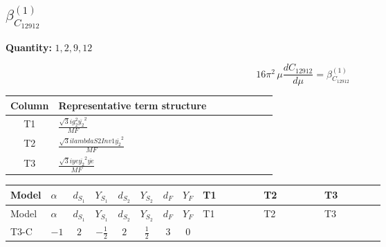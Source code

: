 \documentclass[8pt]{article}
\begin{document}
\begin{landscape}
\section*{$\beta_{C_{12912}}^{(1)}$}
\noindent\textbf{Quantity: }$\mathrm{1,2,9,12}$\par\smallskip
\[16\pi^2\,\mu\frac{d C_{12912}}{d\mu}=\beta_{C_{12912}}^{(1)}\]
\begin{center}
\begin{tabular}{@{}c >{\raggedright\arraybackslash}p{0.82\linewidth}@{}}
\toprule
Column & Representative term structure \\
\midrule
T1 & \(\displaystyle \frac{\sqrt{3} i g_{2}^{2} \overline{y_{2}}^{2}}{MF}\) \\
\midrule
T2 & \(\displaystyle \frac{\sqrt{3} i lambdaS2Inv1 \overline{y_{2}}^{2}}{MF}\) \\
\midrule
T3 & \(\displaystyle \frac{\sqrt{3} i ye \overline{y_{2}}^{2} \overline{ye}}{MF}\) \\
\midrule
\bottomrule
\end{tabular}
\end{center}
\smallskip
\tiny
\begin{longtable}{@{}llcccccc >{\raggedright\arraybackslash}p{0.21\linewidth} >{\raggedright\arraybackslash}p{0.21\linewidth} >{\raggedright\arraybackslash}p{0.21\linewidth}@{}}
\toprule
Model & $\alpha$ & $d_{S_1}$ & $Y_{S_1}$ & $d_{S_2}$ & $Y_{S_2}$ & $d_F$ & $Y_F$ & T1 & T2 & T3 \\
\midrule
\endfirsthead
\toprule
Model & $\alpha$ & $d_{S_1}$ & $Y_{S_1}$ & $d_{S_2}$ & $Y_{S_2}$ & $d_F$ & $Y_F$ & T1 & T2 & T3 \\
\midrule
\endhead
T3-C & $-1$ & $2$ & $-\frac{1}{2}$ & $2$ & $\frac{1}{2}$ & $3$ & $0$ & \scriptsize\adjustbox{max width=\linewidth}{$\begin{gathered} \frac{\sqrt{3} i g_{2}^{2} \overline{y_{2}}^{2}}{8 MF}\end{gathered}$} & \scriptsize\adjustbox{max width=\linewidth}{$\begin{gathered} \frac{\sqrt{3} i lambdaS2Inv1 \overline{y_{2}}^{2}}{12 MF}\end{gathered}$} & \scriptsize\adjustbox{max width=\linewidth}{$\begin{gathered} - \frac{\sqrt{3} i ye \overline{y_{2}}^{2} \overline{ye}}{24 MF}\end{gathered}$} \\
\midrule
\bottomrule
\end{longtable}
\clearpage

\end{landscape}
\end{document}
